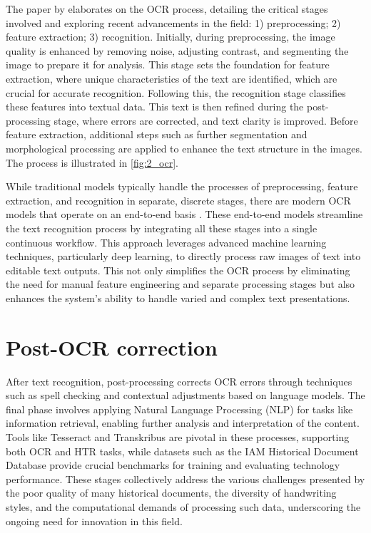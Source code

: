 The paper by \cite{karthick2019steps} elaborates on the OCR process, detailing the critical stages involved and exploring recent advancements in the field: 1) preprocessing; 2) feature extraction; 3) recognition. Initially, during preprocessing, the image quality is enhanced by removing noise, adjusting contrast, and segmenting the image to prepare it for analysis. This stage sets the foundation for feature extraction, where unique characteristics of the text are identified, which are crucial for accurate recognition. Following this, the recognition stage classifies these features into textual data. This text is then refined during the post-processing stage, where errors are corrected, and text clarity is improved. Before feature extraction, additional steps such as further segmentation and morphological processing are applied to enhance the text structure in the images. The process is illustrated in \autoref{fig:2_ocr}.


While traditional models typically handle the processes of preprocessing, feature extraction, and recognition in separate, discrete stages, there are modern OCR models that operate on an end-to-end basis \citep{huang2021multiplexed}\citep{neudecker2019ocr}\citep{belay2020amharic}. These end-to-end models streamline the text recognition process by integrating all these stages into a single continuous workflow. This approach leverages advanced machine learning techniques, particularly deep learning, to directly process raw images of text into editable text outputs. This not only simplifies the OCR process by eliminating the need for manual feature engineering and separate processing stages but also enhances the system’s ability to handle varied and complex text presentations.

\section{Post-OCR correction}
\label{sec:2_post-ocr_correction}
After text recognition, post-processing corrects OCR errors through techniques such as spell checking and contextual adjustments based on language models. The final phase involves applying Natural Language Processing (NLP) for tasks like information retrieval, enabling further analysis and interpretation of the content. Tools like Tesseract \citep{smith2007overview} and Transkribus \citep{kahle2017transkribus} are pivotal in these processes, supporting both OCR and HTR tasks, while datasets such as the IAM Historical Document Database \citep{marti1999full} provide crucial benchmarks for training and evaluating technology performance. These stages collectively address the various challenges presented by the poor quality of many historical documents, the diversity of handwriting styles, and the computational demands of processing such data, underscoring the ongoing need for innovation in this field.

